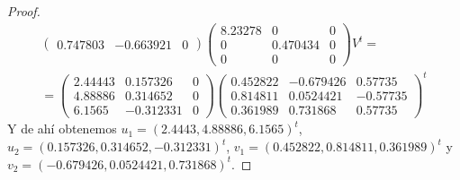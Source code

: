 \documentclass[12pt]{article}
\theoremstyle{break}
\newtheorem*{proof}{Demostración}
\begin{document}
\begin{proof}
\begin{gather*}
\begin{pmatrix}
			0.747803 & -0.663921 & 0
		\end{pmatrix} \begin{pmatrix}
			8.23278 & 0 & 0 \\ 0 & 0.470434 & 0 \\ 0 & 0 & 0
		\end{pmatrix} V^t = \\ =
		\begin{pmatrix}
			2.44443 & 0.157326 & 0 \\ 4.88886 & 0.314652 & 0 \\ 6.1565 & -0.312331 & 0
		\end{pmatrix}\begin{pmatrix}
			0.452822 & -0.679426 & 0.57735 \\ 0.814811 & 0.0524421 & -0.57735 \\
			0.361989 & 0.731868 & 0.57735
		\end{pmatrix}^t
	\end{gather*}
	Y de ahí obtenemos $u_1 = (2.4443,4.88886,6.1565)^t$,
	$u_2 = (0.157326,0.314652,-0.312331)^t$, $v_1 = (0.452822,0.814811,0.361989)^t$ y
	$v_2 = (-0.679426,0.0524421,0.731868)^t$.
\end{proof}
\end{document}
